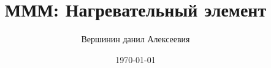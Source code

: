 \documentclass[a4paper,12pt]{article}
\begin{document}
	
	\title{МММ: Нагревательный элемент}
	\author{Вершинин данил Алексеевия}
	\date{\today}
	\maketitle
	

	   
	
\end{document}
